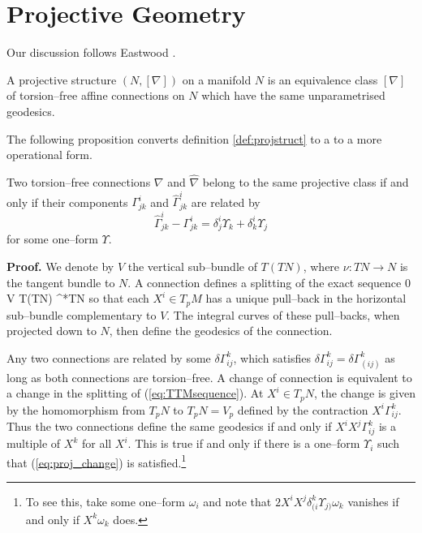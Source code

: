 \section{Projective Geometry}\label{sec:projgeom}

Our discussion follows Eastwood \cite{Eastwood}.

\begin{defi}\label{def:projstruct} A projective structure $(N,[\nabla])$
on a manifold $N$ is an equivalence class $[\nabla]$ of torsion--free affine connections on $N$ which have the same unparametrised geodesics.
\end{defi}

The following proposition converts definition \ref{def:projstruct} to a to a more operational form.

\begin{prop} Two torsion--free connections $\nabla$ and $\widehat{\nabla}$ belong to the same projective class if and only if their components $\Gamma^i_{jk}$ and $\widehat{\Gamma}^i_{jk}$ are related by
\begin{equation}
\widehat{\Gamma}^i_{jk} - \Gamma^i_{jk} = \delta_{j}^{i}\Upsilon_{k}+\delta_{k}^{i}\Upsilon_{j}\label{eq:proj_change}
\end{equation}
for some one--form $\Upsilon.$
\end{prop}

{\bf Proof.} We denote by $V$ the vertical sub--bundle of $T(TN)$, where $\nu:TN\rightarrow N$ is the tangent bundle to $N$. A connection defines a splitting of the exact sequence
\be \label{eq:TTMsequence}
0 \longrightarrow V \longrightarrow T(TN) \longrightarrow \nu^*TN 
\ee
so that each $X^i\in T_pM$ has a unique pull--back in the horizontal sub--bundle complementary to $V$. The integral curves of these pull--backs, when projected down to $N$, then define the geodesics of the connection.

Any two connections are related by some $\delta\Gamma^k_{ij}$, which satisfies $\delta\Gamma^k_{ij}=\delta\Gamma^k_{(ij)}$ as long as both connections are torsion--free. A change of connection is equivalent to a change in the splitting of (\ref{eq:TTMsequence}). At $X^i\in T_pN$, the change is given by the homomorphism from $T_pN$ to $T_pN=V_p$ defined by the contraction $X^i\Gamma^k_{ij}$. Thus the two connections define the same geodesics if and only if $X^iX^j\Gamma^k_{ij}$ is a multiple of $X^k$ for all $X^i$. This is true if and only if there is a one--form $\Upsilon_i$ such that (\ref{eq:proj_change}) is satisfied.\footnote{To see this, take some one--form $\omega_i$ and note that $2X^iX^j\delta^k_{(i}\Upsilon_{j)}\omega_k$ vanishes if and only if $X^k\omega_k$ does.}
\koniec

